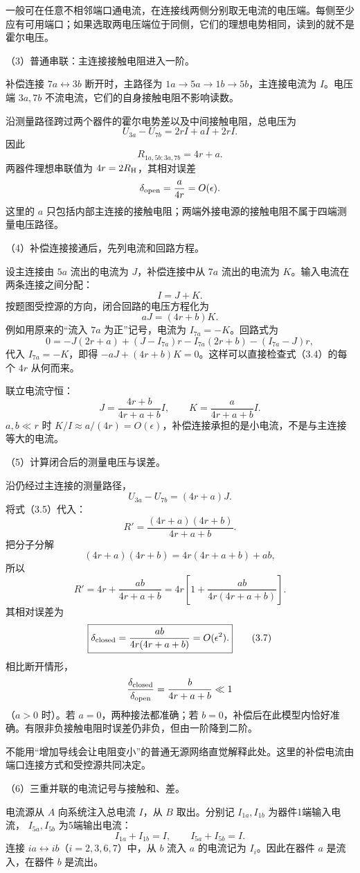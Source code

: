 \documentclass[12pt,a4paper,fontset=fandol]{ctexart}
\begin{document}
一般可在任意不相邻端口通电流，在连接线两侧分别取无电流的电压端。每侧至少应有可用端口；如果选取两电压端位于同侧，它们的理想电势相同，读到的就不是霍尔电压。

（3）普通串联：主连接接触电阻进入一阶。

补偿连接 \(7a\leftrightarrow3b\) 断开时，主路径为
\(1a\to5a\to1b\to5b\)，主连接电流为 \(I\)。电压端 \(3a,7b\)
不流电流，它们的自身接触电阻不影响读数。

沿测量路径跨过两个器件的霍尔电势差以及中间接触电阻，总电压为 \[
U_{3a}-U_{7b}=2rI+aI+2rI.
\] 因此 \[
\boxed{R_{1a,5b;3a,7b}=4r+a.}\tag{3.3}
\] 两器件理想串联值为 \(4r=2R_{\rm H}\)，其相对误差 \[
\delta_{\rm open}=\frac{a}{4r}=O(\epsilon).
\] 这里的 \(a\)
只包括内部主连接的接触电阻；两端外接电源的接触电阻不属于四端测量电压路径。

（4）补偿连接接通后，先列电流和回路方程。

设主连接由 \(5a\) 流出的电流为 \(J\)，补偿连接中从 \(7a\) 流出的电流为
\(K\)。输入电流在两条连接之间分配： \[
I=J+K.
\] 按题图受控源的方向，闭合回路的电压方程化为 \[
aJ=(4r+b)K.\tag{3.4}
\] 例如用原来的``流入 \(7a\) 为正''记号，电流为 \(I_{7a}=-K\)。回路式为
\[
0=-J(2r+a)+(J-I_{7a})r
-I_{7a}(2r+b)-(I_{7a}-J)r,
\] 代入 \(I_{7a}=-K\)，即得
\(-aJ+(4r+b)K=0\)。这样可以直接检查式（3.4）的每个 \(4r\) 从何而来。

联立电流守恒： \[
\boxed{J=\frac{4r+b}{4r+a+b}I,\qquad
K=\frac{a}{4r+a+b}I.}\tag{3.5}
\] \(a,b\ll r\) 时
\(K/I\approx a/(4r)=O(\epsilon)\)，补偿连接承担的是小电流，不是与主连接等大的电流。

（5）计算闭合后的测量电压与误差。

沿仍经过主连接的测量路径， \[
U_{3a}-U_{7b}=(4r+a)J.
\] 将式（3.5）代入： \[
R'=\frac{(4r+a)(4r+b)}{4r+a+b}.
\] 把分子分解 \[
(4r+a)(4r+b)=4r(4r+a+b)+ab,
\] 所以 \[
\boxed{R'=4r+\frac{ab}{4r+a+b}
=4r\left[1+\frac{ab}{4r(4r+a+b)}\right].}\tag{3.6}
\] 其相对误差为 \[
\boxed{\delta_{\rm closed}
=\frac{ab}{4r(4r+a+b)}=O(\epsilon^2).}\tag{3.7}
\] 相比断开情形， \[
\frac{\delta_{\rm closed}}{\delta_{\rm open}}
=\frac{b}{4r+a+b}\ll1
\] （\(a>0\) 时）。若 \(a=0\)，两种接法都准确；若
\(b=0\)，补偿后在此模型内恰好准确。有限非负接触电阻时误差仍非负，但由一阶降到二阶。

不能用``增加导线会让电阻变小''的普通无源网络直觉解释此处。这里的补偿电流由端口连接方式和受控源共同决定。

（6）三重并联的电流记号与接触和、差。

电流源从 \(A\) 向系统注入总电流 \(I\)，从 \(B\) 取出。分别记
\(I_{1a},I_{1b}\) 为器件1端输入电流， \(I_{5a},I_{5b}\) 为5端输出电流：
\[
I_{1a}+I_{1b}=I,\qquad
I_{5a}+I_{5b}=I.
\] 连接 \(ia\leftrightarrow ib\)（\(i=2,3,6,7\)）中，从 \(b\) 流入 \(a\)
的电流记为 \(I_i\)。因此在器件 \(a\) 是流入，在器件 \(b\) 是流出。
\end{document}
